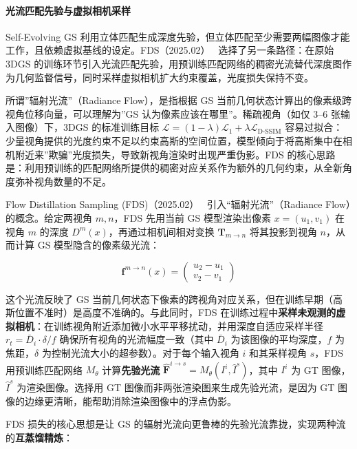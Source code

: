 \paragraph{光流匹配先验与虚拟相机采样}

Self-Evolving GS 利用立体匹配生成深度先验，但立体匹配至少需要两幅图像才能工作，且依赖虚拟基线的设定。FDS（2025.02）~\cite{2502_07615} 选择了另一条路径：在原始 3DGS 的训练环节引入光流匹配先验，用预训练匹配网络的稠密光流替代深度图作为几何监督信号，同时采样虚拟相机扩大约束覆盖，光度损失保持不变。

所谓”辐射光流”（Radiance Flow），是指根据 GS 当前几何状态计算出的像素级跨视角位移向量，可以理解为”GS 认为像素应该在哪里”。稀疏视角（如仅 3--6 张输入图像）下，3DGS 的标准训练目标 $\mathcal{L} = (1-\lambda)\mathcal{L}_1 + \lambda \mathcal{L}_{\text{D-SSIM}}$ 容易过拟合：少量视角提供的光度约束不足以约束高斯的空间位置，模型倾向于将高斯集中在相机附近来”欺骗”光度损失，导致新视角渲染时出现严重伪影。FDS 的核心思路是：利用预训练的匹配网络所提供的稠密对应关系作为额外的几何约束，从全新角度弥补视角数量的不足。

Flow Distillation Sampling (FDS)（2025.02）~\cite{2502_07615} 引入“辐射光流”（Radiance Flow）的概念。给定两视角 $m, n$，FDS 先用当前 GS 模型渲染出像素 $x = (u_1, v_1)$ 在视角 $m$ 的深度 $D^m(x)$，再通过相机间相对变换 $\mathbf{T}_{m \to n}$ 将其投影到视角 $n$，从而计算 GS 模型隐含的像素级光流：

\begin{equation}
\mathbf{f}^{m \to n}(x) = \begin{pmatrix} u_2 - u_1 \\ v_2 - v_1 \end{pmatrix}
\end{equation}

这个光流反映了 GS 当前几何状态下像素的跨视角对应关系，但在训练早期（高斯位置不准时）是高度不准确的。与此同时，FDS 在训练过程中\textbf{采样未观测的虚拟相机}：在训练视角附近添加微小水平平移扰动，并用深度自适应采样半径 $r_t = \bar{D}_i \cdot \delta / f$ 确保所有视角的光流幅度一致（其中 $\bar{D}_i$ 为该图像的平均深度，$f$ 为焦距，$\delta$ 为控制光流大小的超参数）。对于每个输入视角 $i$ 和其采样视角 $s$，FDS 用预训练匹配网络 $M_\theta$ 计算\textbf{先验光流} $\hat{\mathbf{F}}^{i \to s} = M_\theta(I^i, \hat{I}^s)$，其中 $I^i$ 为 GT 图像，$\hat{I}^s$ 为渲染图像。选择用 GT 图像而非两张渲染图来生成先验光流，是因为 GT 图像的边缘更清晰，能帮助消除渲染图像中的浮点伪影。

FDS 损失的核心思想是让 GS 的辐射光流向更鲁棒的先验光流靠拢，实现两种流的\textbf{互蒸馏精炼}：

